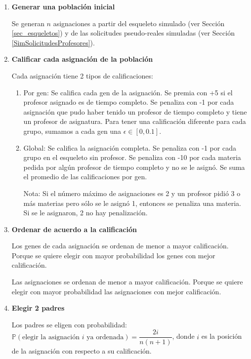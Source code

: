\begin{enumerate}
\item \textbf{Generar una población inicial}

Se generan $n$ asignaciones a partir del esqueleto simulado (ver Sección \ref{sec_esqueletos}) y de las solicitudes pseudo-reales simuladas (ver Sección \ref{SimSolicitudesProfesores}).

\item \textbf{Calificar cada asignación de la población}

Cada asignación tiene 2 tipos de calificaciones:

\begin{enumerate}
\item Por gen: Se califica cada gen de la asignación. Se premia con +5 si el profesor asignado es de tiempo completo. Se penaliza con -1 por cada asignación que pudo haber tenido un profesor de tiempo completo y tiene un profesor de asignatura. Para tener una calificación diferente para cada grupo, sumamos a cada gen una $\epsilon \in [0,0.1]$.

\item Global: Se califica la asignación completa. Se penaliza con -1 por cada grupo en el esqueleto sin profesor. Se penaliza con -10 por cada materia pedida por algún profesor de tiempo completo y no se le asignó. Se suma el promedio de las calificaciones por gen.

Nota:
Si el número máximo de asignaciones es 2 y un profesor pidió 3 o más  materias pero sólo se le asignó 1, entonces se penaliza una materia. Si se le asignaron, 2 no hay penalización.
\end{enumerate}

\item \textbf{Ordenar de acuerdo a la calificación}

Los genes de cada asignación se ordenan de menor a mayor calificación. Porque se quiere elegir con mayor probabilidad los genes con mejor calificación.

Las asignaciones se ordenan de menor a mayor calificación. Porque se quiere elegir con mayor probabilidad las asignaciones con mejor calificación.

\item \textbf{Elegir 2 padres}

Los padres se eligen con probabilidad: $\mathbb{P}(\text{elegir la asignación } i \text{ ya ordenada}) = \dfrac{2i}{n(n+1)}$, donde $i$ es la posición de la asignación con respecto a su calificación.


\end{enumerate}
